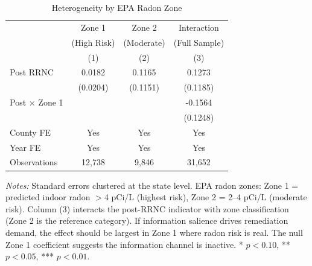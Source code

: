 \begin{table}[htbp]
\centering
\caption{Heterogeneity by EPA Radon Zone}
\label{tab:zones}
\begin{tabular}{lccc}
\hline\hline
 & Zone 1 & Zone 2 & Interaction \\
 & (High Risk) & (Moderate) & (Full Sample) \\
 & (1) & (2) & (3) \\
\hline
Post RRNC & 0.0182 & 0.1165 & 0.1273 \\
 & (0.0204) & (0.1151) & (0.1185) \\
Post $\times$ Zone 1 & & & -0.1564 \\
 & & & (0.1248) \\
\hline
County FE & Yes & Yes & Yes \\
Year FE & Yes & Yes & Yes \\
Observations & 12,738 & 9,846 & 31,652 \\
\hline\hline
\end{tabular}
\begin{tablenotes}[flushleft]
\small
\item \textit{Notes:} Standard errors clustered at the state level. EPA radon zones: Zone 1 = predicted indoor radon $>$4 pCi/L (highest risk), Zone 2 = 2--4 pCi/L (moderate risk). Column (3) interacts the post-RRNC indicator with zone classification (Zone 2 is the reference category). If information salience drives remediation demand, the effect should be largest in Zone 1 where radon risk is real. The null Zone 1 coefficient suggests the information channel is inactive. * $p<0.10$, ** $p<0.05$, *** $p<0.01$.
\end{tablenotes}
\end{table}

